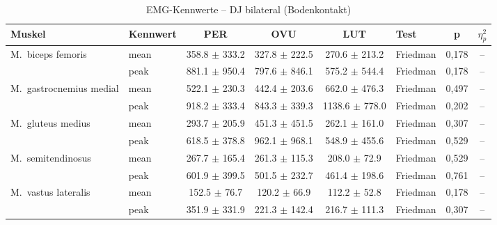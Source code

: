 \begin{table}[H]
  \centering
  \caption{EMG-Kennwerte – DJ bilateral (Bodenkontakt)}
  \label{tab:DJ_bilateral_Bodenkontakt}
  \small
  \begin{tabular}{l l c c c l c c}
    \hline
    \textbf{Muskel} & \textbf{Kennwert} & \textbf{PER} & \textbf{OVU} & \textbf{LUT} & \textbf{Test} & \textbf{p} & \textbf{$\eta^2_p$} \\
    \hline
    M.~biceps femoris & mean & 358.8 $\pm$ 333.2 & 327.8 $\pm$ 222.5 & 270.6 $\pm$ 213.2 & Friedman & 0{,}178 & -- \\
     & peak & 881.1 $\pm$ 950.4 & 797.6 $\pm$ 846.1 & 575.2 $\pm$ 544.4 & Friedman & 0{,}178 & -- \\
    \hline
    M.~gastrocnemius medial & mean & 522.1 $\pm$ 230.3 & 442.4 $\pm$ 203.6 & 662.0 $\pm$ 476.3 & Friedman & 0{,}497 & -- \\
     & peak & 918.2 $\pm$ 333.4 & 843.3 $\pm$ 339.3 & 1138.6 $\pm$ 778.0 & Friedman & 0{,}202 & -- \\
    \hline
    M.~gluteus medius & mean & 293.7 $\pm$ 205.9 & 451.3 $\pm$ 451.5 & 262.1 $\pm$ 161.0 & Friedman & 0{,}307 & -- \\
     & peak & 618.5 $\pm$ 378.8 & 962.1 $\pm$ 968.1 & 548.9 $\pm$ 455.6 & Friedman & 0{,}529 & -- \\
    \hline
    M.~semitendinosus & mean & 267.7 $\pm$ 165.4 & 261.3 $\pm$ 115.3 & 208.0 $\pm$ 72.9 & Friedman & 0{,}529 & -- \\
     & peak & 601.9 $\pm$ 399.5 & 501.5 $\pm$ 232.7 & 461.4 $\pm$ 198.6 & Friedman & 0{,}761 & -- \\
    \hline
    M.~vastus lateralis & mean & 152.5 $\pm$ 76.7 & 120.2 $\pm$ 66.9 & 112.2 $\pm$ 52.8 & Friedman & 0{,}178 & -- \\
     & peak & 351.9 $\pm$ 331.9 & 221.3 $\pm$ 142.4 & 216.7 $\pm$ 111.3 & Friedman & 0{,}307 & -- \\
    \hline
  \end{tabular}
\end{table}

